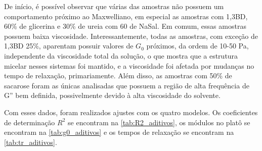 	De início, é possível observar que várias das amostras não possuem um comportamento próximo ao Maxwelliano, em especial as amostras com 1,3BD, 60\% de glicerina e 30\% de ureia com 60 \mM{} de NaSal. Em comum, essas amostras possuem baixa viscosidade. Interessantemente, todas as amostras, com exceção de 1,3BD 25\%, aparentam possuir valores de \(G_0\) próximos, da ordem de 10-50 Pa, independente da viscosidade total da solução, o que mostra que a estrutura micelar nesses sistemas foi mantido, e a viscosidade foi afetada por mudanças no tempo de relaxação, primariamente. Além disso, as amostras com 50\% de sacarose foram as únicas analisadas que possuem a região de alta frequência de G'' bem definida, possivelmente devido à alta viscosidade do solvente.
	
	Com esses dados, foram realizados ajustes com os quatro modelos. Os coeficientes de determinação \(R^2\) se encontram na \autoref{tab:R2_aditivos}, os módulos no platô se encontram na \autoref{tab:g0_aditivos} e os tempos de relaxação se encontram na \autoref{tab:tr_aditivos}. 


